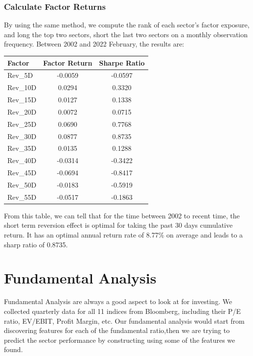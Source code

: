 \documentclass{article}
\begin{document}
\subsubsection{Calculate Factor Returns}
By using the same method, we compute the rank of each sector's factor exposure, and long the top two sectors, short the last two sectors on a monthly observation frequency. Between 2002 and 2022 February, the results are:
    \begin{center}
    \begin{tabular}{|l|S[table-format=3.1(3)]|S[table-format=3.1(3)]|}
    \hline
        {Factor} & {Factor Return} & {Sharpe Ratio}  \\ \hline
        {Rev\_5D} & -0.0059 & -0.0597  \\ \hline
        {Rev\_10D} & 0.0294 & 0.3320  \\ \hline
        {Rev\_15D} & 0.0127 & 0.1338  \\ \hline
        {Rev\_20D} & 0.0072 & 0.0715  \\ \hline
        {Rev\_25D} & 0.0690 & 0.7768  \\ \hline
        {Rev\_30D} & 0.0877 & 0.8735  \\ \hline
        {Rev\_35D} & 0.0135 & 0.1288  \\ \hline
        {Rev\_40D} & -0.0314 & -0.3422  \\ \hline
        {Rev\_45D} & -0.0694 & -0.8417  \\ \hline
        {Rev\_50D} & -0.0183 & -0.5919  \\ \hline
        {Rev\_55D} & -0.0517 & -0.1863 \\ \hline
    \end{tabular}
    \end{center}

From this table, we can tell that for the time between 2002 to recent time, the short term reversion effect is optimal for taking the past 30 days cumulative return. It has an optimal annual return rate of 8.77$\%$ on average and leads to a sharp ratio of 0.8735. 



\section{Fundamental Analysis}
Fundamental Analysis are always a good aspect to look at for investing. We collected quarterly data for all 11 indices from Bloomberg, including their P/E ratio, EV/EBIT, Profit Margin, etc. Our fundamental analysis would start from discovering features for each of the fundamental ratio,then we are trying to predict the sector performance by constructing using some of the features we found.
\end{document}
